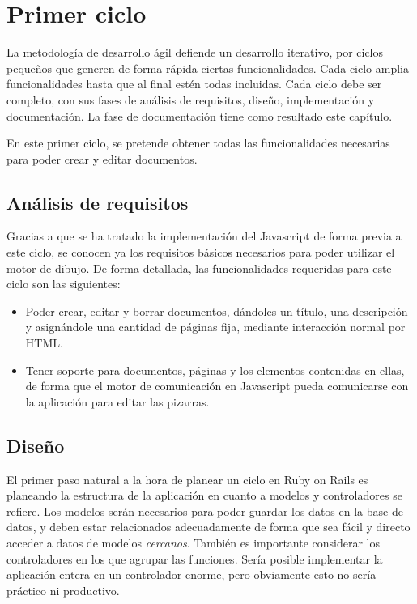 \section{Primer ciclo} %
\label{sec:primer_ciclo}
La metodología de desarrollo ágil defiende un desarrollo iterativo, por ciclos pequeños que generen de forma rápida ciertas funcionalidades. Cada ciclo amplia funcionalidades hasta que al final estén todas incluidas. Cada ciclo debe ser completo, con sus fases de análisis de requisitos, diseño, implementación y documentación. La fase de documentación tiene como resultado este capítulo.

En este primer ciclo, se pretende obtener todas las funcionalidades necesarias para poder crear y editar documentos.

\subsection{Análisis de requisitos} %
\label{sub:análisis_de_requisitos}

Gracias a que se ha tratado la implementación del Javascript de forma previa a este ciclo, se conocen ya los requisitos básicos necesarios para poder utilizar el motor de dibujo. De forma detallada, las funcionalidades requeridas para este ciclo son las siguientes:

\begin{itemize}
  \item Poder crear, editar y borrar documentos, dándoles un título, una descripción y asignándole una cantidad de páginas fija, mediante interacción normal por HTML.
  \item Tener soporte para documentos, páginas y los elementos contenidas en ellas, de forma que el motor de comunicación en Javascript pueda comunicarse con la aplicación para editar las pizarras.
\end{itemize}


\subsection{Diseño} %
\label{sub:diseño}

El primer paso natural a la hora de planear un ciclo en Ruby on Rails es planeando la estructura de la aplicación en cuanto a modelos y controladores se refiere. Los modelos serán necesarios para poder guardar los datos en la base de datos, y deben estar relacionados adecuadamente de forma que sea fácil y directo acceder a datos de modelos \emph{cercanos}. También es importante considerar los controladores en los que agrupar las funciones. Sería posible implementar la aplicación entera en un controlador enorme, pero obviamente esto no sería práctico ni productivo.

